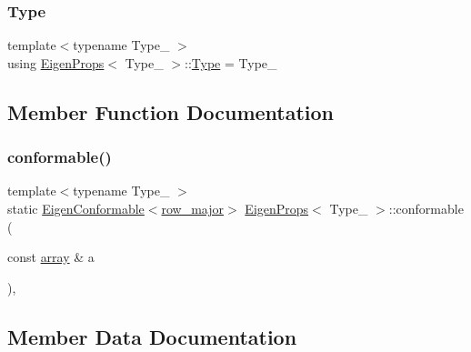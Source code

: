 \mbox{\label{struct_eigen_props_ababed0b6298eeb5f4ded06da92c96cd7}} 
\subsubsection{\texorpdfstring{Type}{Type}}
{\footnotesize\ttfamily template$<$typename Type\+\_\+ $>$ \\
using \mbox{\hyperlink{struct_eigen_props}{Eigen\+Props}}$<$ Type\+\_\+ $>$\+::\mbox{\hyperlink{struct_eigen_props_ababed0b6298eeb5f4ded06da92c96cd7}{Type}} =  Type\+\_\+}



\subsection{Member Function Documentation}
\mbox{\label{struct_eigen_props_a370b3557e63a8619c290a0dd36523a14}} 
\subsubsection{\texorpdfstring{conformable()}{conformable()}}
{\footnotesize\ttfamily template$<$typename Type\+\_\+ $>$ \\
static \mbox{\hyperlink{struct_eigen_conformable}{Eigen\+Conformable}}$<$\mbox{\hyperlink{struct_eigen_props_a290ebf6baed2dca134f928c13dda4030}{row\+\_\+major}}$>$ \mbox{\hyperlink{struct_eigen_props}{Eigen\+Props}}$<$ Type\+\_\+ $>$\+::conformable (\begin{DoxyParamCaption}\item[{const \mbox{\hyperlink{classarray}{array}} \&}]{a }\end{DoxyParamCaption})\hspace{0.3cm}{\ttfamily [inline]}, {\ttfamily [static]}}



\subsection{Member Data Documentation}
\mbox{\label{struct_eigen_props_a11241a3435168ade35c58f1a2899df8b}} 
